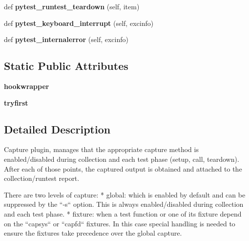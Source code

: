 \begin{DoxyCompactItemize}
def {\bfseries pytest\+\_\+runtest\+\_\+teardown} (self, item)
\item 
\mbox{\label{class__pytest_1_1capture_1_1_capture_manager_a63e68311e3ff04b7adb1620f96a31027}} 
def {\bfseries pytest\+\_\+keyboard\+\_\+interrupt} (self, excinfo)
\item 
\mbox{\label{class__pytest_1_1capture_1_1_capture_manager_a0df2aee1b8aff5e80cc2c3bbed36ae9f}} 
def {\bfseries pytest\+\_\+internalerror} (self, excinfo)
\end{DoxyCompactItemize}
\subsection*{Static Public Attributes}
\begin{DoxyCompactItemize}
\item 
\mbox{\label{class__pytest_1_1capture_1_1_capture_manager_a19b3da8f2065c77933bfda5ad6947c11}} 
{\bfseries hookwrapper}
\item 
\mbox{\label{class__pytest_1_1capture_1_1_capture_manager_a689fe651d82562b71595081684304e80}} 
{\bfseries tryfirst}
\end{DoxyCompactItemize}


\subsection{Detailed Description}
\begin{DoxyVerb}Capture plugin, manages that the appropriate capture method is enabled/disabled during collection and each
test phase (setup, call, teardown). After each of those points, the captured output is obtained and
attached to the collection/runtest report.

There are two levels of capture:
* global: which is enabled by default and can be suppressed by the ``-s`` option. This is always enabled/disabled
  during collection and each test phase.
* fixture: when a test function or one of its fixture depend on the ``capsys`` or ``capfd`` fixtures. In this
  case special handling is needed to ensure the fixtures take precedence over the global capture.
\end{DoxyVerb}
 

